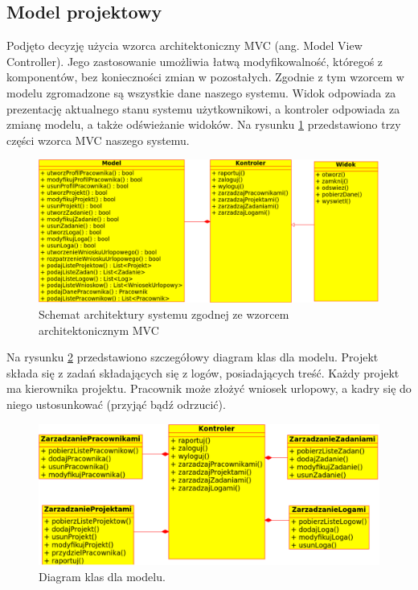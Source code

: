 \subsection{Model projektowy}
\begin{adjustwidth}{4em}{0pt}

Podjęto decyzję użycia wzorca architektoniczny MVC (ang. Model View Controller). 
Jego zastosowanie umożliwia łatwą modyfikowalność, któregoś z komponentów, bez                                                                                               
konieczności zmian w pozostałych. Zgodnie z tym wzorcem w modelu zgromadzone są wszystkie dane naszego systemu. 
Widok odpowiada za prezentację aktualnego stanu systemu użytkownikowi, a kontroler odpowiada za zmianę modelu, a także odświeżanie widoków.
Na rysunku \ref{fig:mvc} przedstawiono trzy części wzorca MVC naszego systemu.

\begin{figure}[H]
    \centering
    \includegraphics[scale=0.5]{diagramy/modelKlas/mvc.pdf}
    \caption{Schemat architektury systemu zgodnej ze wzorcem architektonicznym MVC}
    \label{fig:mvc}
\end{figure}

Na rysunku \ref{fig:ModelDiagramKlas} przedstawiono szczegółowy diagram klas dla modelu. Projekt składa się z zadań składających się z logów, posiadających
treść. Każdy projekt ma kierownika projektu. Pracownik może złożyć wniosek urlopowy, a kadry się do niego ustosunkować (przyjąć bądź odrzucić).

\begin{figure}[H]
    \centering
    \includegraphics[scale=0.5]{diagramy/modelKlas/ModelDiagramKlas}
    \caption{Diagram klas dla modelu.}
    \label{fig:ModelDiagramKlas}
\end{figure}


\end{adjustwidth}
